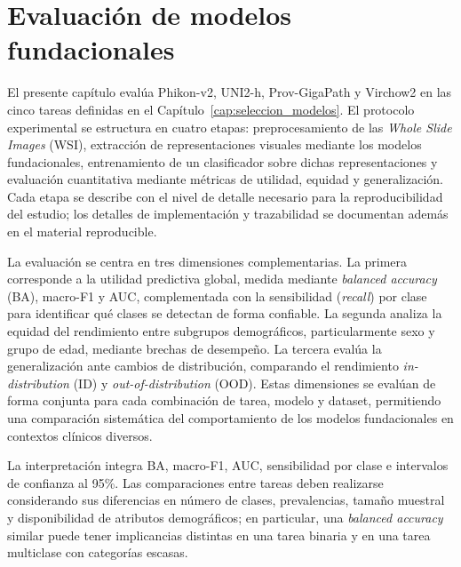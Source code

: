 ﻿%

\chapter{Evaluación de modelos fundacionales}
\label{cap:evaluacion_modelos}

El presente capítulo evalúa Phikon-v2, UNI2-h, Prov-GigaPath y Virchow2 en las cinco tareas definidas en el Capítulo~\ref{cap:seleccion_modelos}. El protocolo experimental se estructura en cuatro etapas: preprocesamiento de las \textit{Whole Slide Images} (WSI), extracción de representaciones visuales mediante los modelos fundacionales, entrenamiento de un clasificador sobre dichas representaciones y evaluación cuantitativa mediante métricas de utilidad, equidad y generalización. Cada etapa se describe con el nivel de detalle necesario para la reproducibilidad del estudio; los detalles de implementación y trazabilidad se documentan además en el material reproducible.

La evaluación se centra en tres dimensiones complementarias. La primera corresponde a la utilidad predictiva global, medida mediante \textit{balanced accuracy} (BA), macro-F1 y AUC, complementada con la sensibilidad (\textit{recall}) por clase para identificar qué clases se detectan de forma confiable. La segunda analiza la equidad del rendimiento entre subgrupos demográficos, particularmente sexo y grupo de edad, mediante brechas de desempeño. La tercera evalúa la generalización ante cambios de distribución, comparando el rendimiento \textit{in-distribution} (ID) y \textit{out-of-distribution} (OOD). Estas dimensiones se evalúan de forma conjunta para cada combinación de tarea, modelo y dataset, permitiendo una comparación sistemática del comportamiento de los modelos fundacionales en contextos clínicos diversos.

La interpretación integra BA, macro-F1, AUC, sensibilidad por clase e intervalos de confianza al 95\%. Las comparaciones entre tareas deben realizarse considerando sus diferencias en número de clases, prevalencias, tamaño muestral y disponibilidad de atributos demográficos; en particular, una \textit{balanced accuracy} similar puede tener implicancias distintas en una tarea binaria y en una tarea multiclase con categorías escasas.

